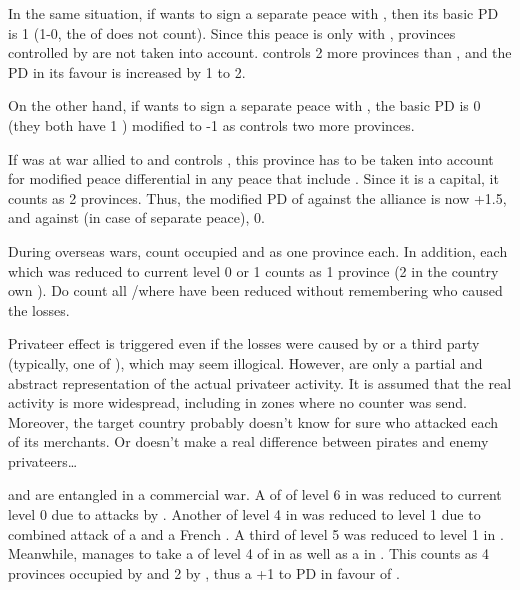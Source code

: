 \begin{exemple}
  In the same situation, if \RUS wants to sign a separate peace with \SUE,
  then its basic PD is 1 (1-0, the \STAB of \TUR does not count). Since this
  peace is only with \SUE, provinces controlled by \TUR are not taken into
  account. \RUS controls 2 more provinces than \SUE, and the PD in its favour
  is increased by 1 to 2.

  On the other hand, if \RUS wants to sign a separate peace with \TUR, the
  basic PD is 0 (they both have 1 \STAB) modified to -1 as \TUR controls two
  more provinces.
\end{exemple}

\begin{exemple}
  If \paysCrimee was at war allied to \TUR and \RUS controls \provinceCrimee,
  this province has to be taken into account for modified peace differential
  in any peace that include \TUR. Since it is a capital, it counts as 2
  provinces. Thus, the modified PD of \RUS against the alliance is now +1.5,
  and against \TUR (in case of separate peace), 0.
\end{exemple}

\label{chPeace:Privateer Effect}
\bparag During overseas wars, count occupied \COL and \TP as one province
each.
 In addition, each \TradeFLEET\Faceplus which was
reduced to current level 0 or 1 counts as 1 province (2 in the country own
\CTZ).
\bparag Do count all \CTZ/\STZ where \TradeFLEET have been reduced without
remembering who caused the losses.

\begin{designnote}
  Privateer effect is triggered even if the losses were caused by
   or a third party \corsaire (typically, one of
  \Barbaresques), which may seem illogical. However, \corsaire are only a
  partial and abstract representation of the actual privateer activity. It is
  assumed that the real activity is more widespread, including in zones where
  no counter was send. Moreover, the target country probably doesn't know for
  sure who attacked each of its merchants. Or doesn't make a real difference
  between pirates and enemy privateers\ldots
\end{designnote}

\begin{exemple}
  \FRA and \ANG are entangled in a commercial war. A \TradeFLEET of \ANG of
  level 6 in  was reduced to current level 0 due to attacks by
  \leaderBart. Another \TradeFLEET of level 4 in  was
  reduced to level 1 due to combined attack of a  \corsaire and
  a French \corsaire. A third \TradeFLEET of level 5 was reduced to level 1 in
  . Meanwhile, \ANG manages to take a \COL of level 4 of \FRA in
  \granderegionQuebec as well as a \TP in \continentIndia. This counts as 4
  provinces occupied by \FRA and 2 by \ANG, thus a +1 to PD in favour of \FRA.
\end{exemple}

